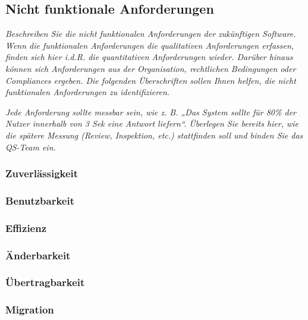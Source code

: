 \subsection{Nicht funktionale Anforderungen}

\textit{
    Beschreiben Sie die nicht funktionalen Anforderungen der zukünftigen Software. Wenn die funktionalen Anforderungen die qualitativen Anforderungen erfassen, finden sich hier i.d.R. die quantitativen Anforderungen wieder. Darüber hinaus können sich Anforderungen aus der Organisation, rechtlichen Bedingungen oder Compliances ergeben. Die folgenden Überschriften sollen Ihnen helfen, die nicht funktionalen Anforderungen zu identifizieren.
}

\textit{
    Jede Anforderung sollte messbar sein, wie z. B. „Das System sollte für 80\% der Nutzer innerhalb von 3 Sek eine Antwort liefern“. Überlegen Sie bereits hier, wie die spätere Messung (Review, Inspektion, etc.) stattfinden soll und binden Sie das QS-Team ein.
}

\subsubsection{Zuverlässigkeit}



\subsubsection{Benutzbarkeit}



\subsubsection{Effizienz}



\subsubsection{Änderbarkeit}



\subsubsection{Übertragbarkeit}



\subsubsection{Migration}

